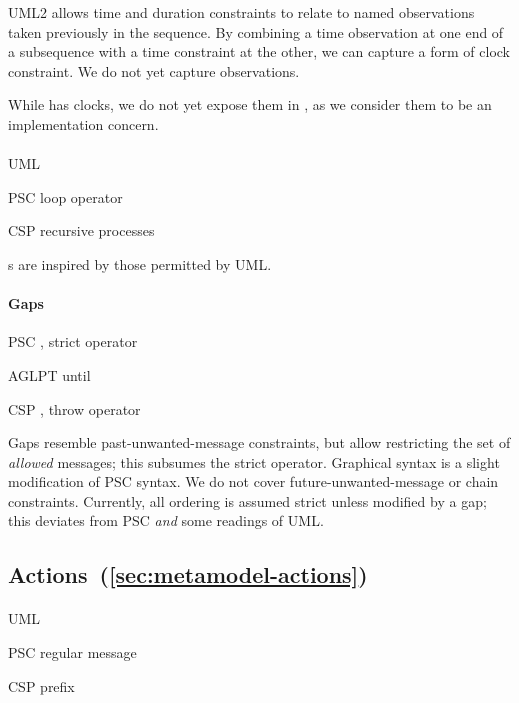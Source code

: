 UML2 allows time and duration constraints to relate to named observations taken
previously in the sequence.  By combining a time observation at one end of a
subsequence with a time constraint at the other, we can capture a form of clock
constraint.  We do not yet capture observations.

While \robochart{} has clocks, we do not yet expose them in
\langname, as we consider them to be an implementation concern.
      
\paragraph{\mloopstep}
\begin{featset}
\item[UML] 
\item[PSC] loop operator
\item[CSP] recursive processes
\end{featset}

\mloopbound s are inspired by those permitted by UML.

\paragraph{Gaps}
\begin{featset}
\item[PSC] , strict operator
\item[AGLPT] until
\item[CSP] , throw operator
\end{featset}

Gaps resemble past-unwanted-message constraints, but
allow restricting the set of \emph{allowed} messages;
this subsumes the strict operator.  Graphical syntax is a slight
modification of PSC syntax.  We do not cover
future-unwanted-message or chain constraints.  Currently, all
ordering is assumed strict unless modified by a gap; this
deviates from PSC \emph{and} some readings of UML.
    
\subsection{Actions~(\ref{sec:metamodel-actions})}

\paragraph{\marrowaction}
\begin{featset}
\item[UML] 
\item[PSC] regular message
\item[CSP] prefix
\end{featset}

